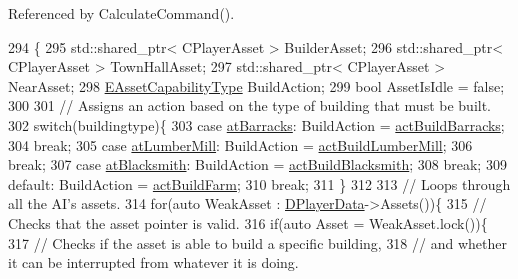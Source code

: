 Referenced by Calculate\+Command().


\begin{DoxyCode}
294                                                                                                          \{
295     std::shared\_ptr< CPlayerAsset > BuilderAsset;
296     std::shared\_ptr< CPlayerAsset > TownHallAsset;
297     std::shared\_ptr< CPlayerAsset > NearAsset;
298     \hyperlink{GameDataTypes_8h_a35b98ce26aca678b03c6f9f76e4778ce}{EAssetCapabilityType} BuildAction;
299     \textcolor{keywordtype}{bool} AssetIsIdle = \textcolor{keyword}{false};
300     
301     \textcolor{comment}{// Assigns an action based on the type of building that must be built.}
302     \textcolor{keywordflow}{switch}(buildingtype)\{
303         \textcolor{keywordflow}{case} \hyperlink{GameDataTypes_8h_a5600d4fc433b83300308921974477feca1cbf6c944f30d615a247eef1f57b2230}{atBarracks}:    BuildAction = \hyperlink{GameDataTypes_8h_a35b98ce26aca678b03c6f9f76e4778ceaea47e79df21160eb97064a18e6d36cac}{actBuildBarracks};
304                             \textcolor{keywordflow}{break};
305         \textcolor{keywordflow}{case} \hyperlink{GameDataTypes_8h_a5600d4fc433b83300308921974477feca7bb38316bc3193b5c9ec67ea6aad549c}{atLumberMill}:  BuildAction = \hyperlink{GameDataTypes_8h_a35b98ce26aca678b03c6f9f76e4778ceaea7fb8009561a58e7b9f2cf741989242}{actBuildLumberMill};
306                             \textcolor{keywordflow}{break};
307         \textcolor{keywordflow}{case} \hyperlink{GameDataTypes_8h_a5600d4fc433b83300308921974477feca2b2badd6cba3212eef87ac295bf9642e}{atBlacksmith}:  BuildAction = \hyperlink{GameDataTypes_8h_a35b98ce26aca678b03c6f9f76e4778cea45224b077989530810879da4e225eac7}{actBuildBlacksmith};
308                             \textcolor{keywordflow}{break};
309         \textcolor{keywordflow}{default}:            BuildAction = \hyperlink{GameDataTypes_8h_a35b98ce26aca678b03c6f9f76e4778cea4de8df4d0a9c3bb6fe33e380bc407078}{actBuildFarm};
310                             \textcolor{keywordflow}{break};
311     \}
312 
313     \textcolor{comment}{// Loops through all the AI's assets.}
314     \textcolor{keywordflow}{for}(\textcolor{keyword}{auto} WeakAsset : \hyperlink{classCAIPlayer_a83b5113c8f7e80df54940b647c5ee2e6}{DPlayerData}->Assets())\{
315         \textcolor{comment}{// Checks that the asset pointer is valid.}
316         \textcolor{keywordflow}{if}(\textcolor{keyword}{auto} Asset = WeakAsset.lock())\{
317             \textcolor{comment}{// Checks if the asset is able to build a specific building, }
318             \textcolor{comment}{// and whether it can be interrupted from whatever it is doing.}

\end{DoxyCode}
